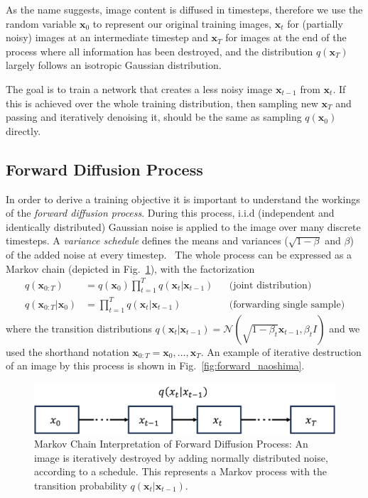 As the name suggests, image content is diffused in timesteps, therefore we use the random variable $\bm{x}_0$ to represent our original training images, $\bm{x}_t$ for (partially noisy) images at an intermediate timestep and $\bm{x}_T$ for images at the end of the process where all information has been destroyed, and the distribution $q(\bm{x}_T)$ largely follows an isotropic Gaussian distribution.

The goal is to train a network that creates a less noisy image $\bm{x}_{t-1}$ from $\bm{x}_t$. If this is achieved over the whole training distribution, then sampling new $\bm{x}_T$ and passing and iteratively denoising it, should be the same as sampling $q(\bm{x}_0)$ directly.

\subsection{Forward Diffusion Process}
In order to derive a training objective it is important to understand the workings of the \textit{forward diffusion process}. During this process, i.i.d (independent and identically distributed) Gaussian noise is applied to the image over many discrete timesteps. A \textit{variance schedule} defines the means and variances ($\sqrt{1-\beta}$ and $\beta$) of the added noise at every timestep.~\autocite{ho2020denoising} The whole process can be expressed as a Markov chain (depicted in Fig.~\ref{fig:forward_diffusion}), with the factorization
\begin{align}
    \label{eq:forwardprocess}
    q(\bm{x}_{0:T})            & = q(\bm{x}_0) \prod_{t=1}^{T} q(\bm{x}_{t}|\bm{x}_{t-1}) &  & \text{(joint distribution)}       \\
    q(\bm{x}_{0:T}|\bm{x}_{0}) & = \prod_{t=1}^{T} q(\bm{x}_{t}|\bm{x}_{t-1})             &  & \text{(forwarding single sample)}
\end{align}
where the transition distributions $q(\bm{x}_t|\bm{x}_{t-1}) = \mathcal{N}(\sqrt{1-\beta_t} \bm{x}_{t-1}, \beta_t I)$ and we used the shorthand notation $\bm{x}_{0:T} = \bm{x}_{0},\dots,\bm{x}_{T}$. An example of iterative destruction of an image by this process is shown in Fig.~\ref{fig:forward_naoshima}.

\begin{figure}[h]
    \centering
    \includegraphics[width=.5\textwidth]{images/forward_diffusion.png}
    \caption[Markov Chain Interpretation of Forward Diffusion Process]{Markov Chain Interpretation of Forward Diffusion Process: An image is iteratively destroyed by adding normally distributed noise,
        according to a schedule. This represents a Markov process with the transition probability $q(\bm{x}_t|\bm{x}_{t-1})$.}
    \label{fig:forward_diffusion}
\end{figure}

